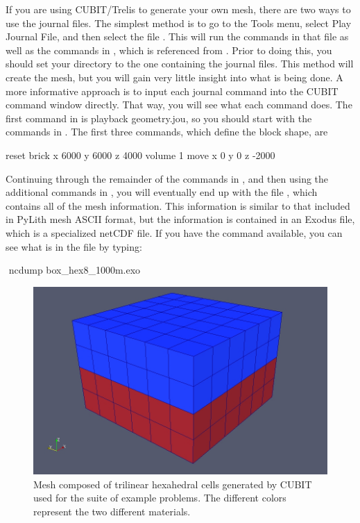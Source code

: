 If you are using CUBIT/Trelis to generate your own mesh, there are two
ways to use the journal files. The simplest method is to go to the
\textsf{Tools} menu, select \textsf{Play Journal File}, and then
select the file . This will run the
commands in that file as well as the commands in
, which is referenced from
. Prior to doing this, you should set
your directory to the one containing the journal files. This method
will create the mesh, but you will gain very little insight into what
is being done. A more informative approach is to input each journal
command into the CUBIT command window directly.  That way, you will
see what each command does. The first command in
 is \textsf{playback geometry.jou}, so
you should start with the commands in . The
first three commands, which define the block shape, are
\begin{shell}
reset
brick x 6000 y 6000 z 4000
volume 1 move x 0 y 0 z -2000
\end{shell}
Continuing through the remainder of the commands in ,
and then using the additional commands in ,
you will eventually end up with the file ,
which contains all of the mesh information. This information is similar
to that included in PyLith mesh ASCII format, but the information
is contained in an Exodus file, which is a specialized netCDF file.
If you have the  command available, you can see what
is in the file by typing:
\begin{shell}
$$ ncdump box_hex8_1000m.exo
\end{shell}

\begin{figure}
  \includegraphics[scale=0.33]{examples/figs/3dhex8_mesh}
  \caption{Mesh composed of trilinear hexahedral cells generated by CUBIT used
    for the suite of example problems. The different colors represent
    the two different materials.}
  \label{fig:3dhex8:mesh}
\end{figure}


